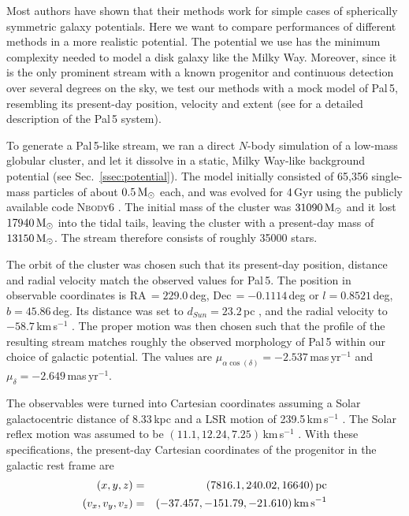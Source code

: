 Most authors have shown that their methods work for simple cases of spherically symmetric galaxy potentials. Here we want to compare performances of different methods in a more realistic potential. The potential we use has the minimum complexity needed to model a disk galaxy like the Milky Way. Moreover, since it is the only prominent stream with a known progenitor and continuous detection over several degrees on the sky, we test our methods with a mock model of Pal\,5, resembling its present-day position, velocity and extent (see \citealt{Kupper15} for a detailed description of the Pal\,5 system).

To generate a Pal\,5-like stream, we ran a direct $N$-body simulation of a low-mass globular cluster, and let it dissolve in a static, Milky Way-like background potential (see Sec.~\ref{ssec:potential}). The model initially consisted of 65,356 single-mass particles of about $0.5\mbox{$\,{\rm M}_\odot$}$ each, and was evolved for 4\,Gyr using the publicly available code \textsc{Nbody6} \citep{Aarseth03, Nitadori12}. The initial mass of the cluster was $31090\mbox{$\,{\rm M}_\odot$}$ and it lost $17940\mbox{$\,{\rm M}_\odot$}$ into the tidal tails, leaving the cluster with a present-day mass of $13150\mbox{$\,{\rm M}_\odot$}$. The stream therefore consists of roughly 35000 stars.

The orbit of the cluster was chosen such that its present-day position, distance and radial velocity match the observed values for Pal\,5. The position in observable coordinates is RA\,$ = 229.0$\,deg, Dec\,$ = -0.1114$\,deg or $l = 0.8521$\,deg, $b = 45.86$\,deg. Its distance was set to $d_{Sun} = 23.2$\,pc \citep{Harris96}, and the radial velocity to $-58.7$\,km\,s$^{-1}$ \citep{Odenkirchen02}. The proper motion was then chosen such that the profile of the resulting stream matches roughly the observed morphology of Pal\,5 within our choice of galactic potential. The values are $\mu_{\alpha\cos(\delta)}=-2.537$\,mas\,yr$^{-1}$ and $\mu_\delta = -2.649$\,mas\,yr$^{-1}$.

The observables were turned into Cartesian coordinates assuming a Solar galactocentric distance of 8.33\,kpc and a LSR motion of 239.5\,km\,s$^{-1}$ \citep{Gillessen09}. The Solar reflex motion was assumed to be $(11.1, 12.24, 7.25)$\,km\,s$^{-1}$ \citep{Schonrich10}. With these specifications, the present-day Cartesian coordinates of the progenitor in the galactic rest frame are 
\begin{eqnarray}
  (x, y, z) &=& (7816.1,  240.02,  16640)\,\mbox{pc}\\
  (v_x, v_y, v_z) &=& (-37.457, -151.79, -21.610)\,\mbox{km\,s}^{-1}
\end{eqnarray}

